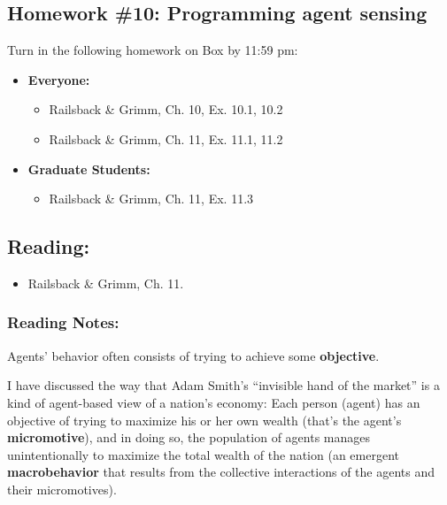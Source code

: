 \documentclass[]{article}
\providecommand{\tightlist}{%
  \setlength{\itemsep}{0pt}\setlength{\parskip}{0pt}}
\begin{document}
\hypertarget{homework-10-programming-agent-sensing}{%
\subsection{Homework \#10: Programming agent
sensing}\label{homework-10-programming-agent-sensing}}

Turn in the following homework on Box by 11:59 pm:

\begin{itemize}
\tightlist
\item
  \textbf{Everyone:}

  \begin{itemize}
  \tightlist
  \item
    Railsback \& Grimm, Ch. 10, Ex. 10.1, 10.2
  \item
    Railsback \& Grimm, Ch. 11, Ex. 11.1, 11.2
  \end{itemize}
\item
  \textbf{Graduate Students:}

  \begin{itemize}
  \tightlist
  \item
    Railsback \& Grimm, Ch. 11, Ex. 11.3
  \end{itemize}
\end{itemize}

\hypertarget{reading-11}{%
\subsection{Reading:}\label{reading-11}}

\begin{itemize}
\tightlist
\item
  Railsback \& Grimm, Ch. 11.
\end{itemize}

\hypertarget{reading-notes-10}{%
\subsubsection{Reading Notes:}\label{reading-notes-10}}

Agents' behavior often consists of trying to achieve some
\textbf{objective}.

I have discussed the way that Adam Smith's ``invisible hand of the
market'' is a kind of agent-based view of a nation's economy: Each
person (agent) has an objective of trying to maximize his or her own
wealth (that's the agent's \textbf{micromotive}), and in doing so, the
population of agents manages unintentionally to maximize the total
wealth of the nation (an emergent \textbf{macrobehavior} that results
from the collective interactions of the agents and their micromotives).
\end{document}

